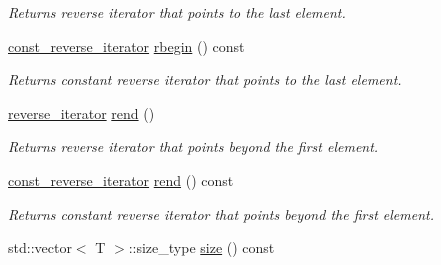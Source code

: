 \begin{CompactItemize}
\begin{CompactList}\small\item\em Returns reverse iterator that points to the last element. \item\end{CompactList}\item 
\hypertarget{classdai_1_1smallSet_fe1d0987a5e6df1f488ac59423e60541}{
\hyperlink{classdai_1_1smallSet_46882a9010267d41f447feb6aaf65cc1}{const\_\-reverse\_\-iterator} \hyperlink{classdai_1_1smallSet_fe1d0987a5e6df1f488ac59423e60541}{rbegin} () const }
\label{classdai_1_1smallSet_fe1d0987a5e6df1f488ac59423e60541}

\begin{CompactList}\small\item\em Returns constant reverse iterator that points to the last element. \item\end{CompactList}\item 
\hypertarget{classdai_1_1smallSet_6c13dd3698d76d85f8ed4be564b10f8c}{
\hyperlink{classdai_1_1smallSet_6dea3ee0aa40c4312e6278a7d17f516d}{reverse\_\-iterator} \hyperlink{classdai_1_1smallSet_6c13dd3698d76d85f8ed4be564b10f8c}{rend} ()}
\label{classdai_1_1smallSet_6c13dd3698d76d85f8ed4be564b10f8c}

\begin{CompactList}\small\item\em Returns reverse iterator that points beyond the first element. \item\end{CompactList}\item 
\hypertarget{classdai_1_1smallSet_72f55e13695e993adc7db6fb40b1cd88}{
\hyperlink{classdai_1_1smallSet_46882a9010267d41f447feb6aaf65cc1}{const\_\-reverse\_\-iterator} \hyperlink{classdai_1_1smallSet_72f55e13695e993adc7db6fb40b1cd88}{rend} () const }
\label{classdai_1_1smallSet_72f55e13695e993adc7db6fb40b1cd88}

\begin{CompactList}\small\item\em Returns constant reverse iterator that points beyond the first element. \item\end{CompactList}\item 
\hypertarget{classdai_1_1smallSet_39b00df453666d22331e932d3b7a2f16}{
std::vector$<$ T $>$::size\_\-type \hyperlink{classdai_1_1smallSet_39b00df453666d22331e932d3b7a2f16}{size} () const }
\label{classdai_1_1smallSet_39b00df453666d22331e932d3b7a2f16}


\end{CompactItemize}
